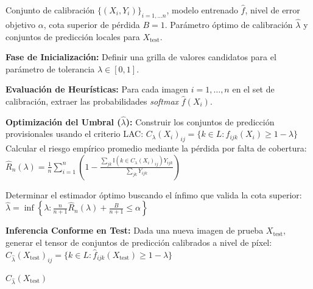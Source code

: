 \begin{algorithm}[H]
\caption{Calibración CRC para Segmentación Semántica Conforme}
\label{alg:crc_segmentation}
\begin{algorithmic}[1]
    \REQUIRE Conjunto de calibración $\{(X_i, Y_i)\}_{i=1, \dots n}$, modelo entrenado $\hat{f}$, nivel de error objetivo $\alpha$, cota superior de pérdida $B=1$.
    \ENSURE Parámetro óptimo de calibración $\hat{\lambda}$ y conjuntos de predicción locales para $X_{\text{test}}$.

    \STATE \textbf{Fase de Inicialización:}
    Definir una grilla de valores candidatos para el parámetro de tolerancia $\lambda \in [0,1]$.

    \STATE \textbf{Evaluación de Heurísticas:}
    Para cada imagen $i = 1, \dots, n$ en el set de calibración, extraer las probabilidades \textit{softmax} $\hat{f}(X_i)$.

    \STATE \textbf{Optimización del Umbral ($\hat{\lambda}$):}
        \STATE Construir los conjuntos de predicción provisionales usando el criterio LAC:
        \STATE $C_\lambda(X_i)_{ij} = \{ k \in L : \hat{f}_{ijk}(X_i) \geq 1 - \lambda \}$
        \STATE Calcular el riesgo empírico promedio mediante la pérdida por falta de cobertura:
        \STATE $\hat{R}_n(\lambda) = \frac{1}{n} \sum_{i=1}^n \left( 1 - \frac{\sum_{jk} \mathbb{I}(k \in C_\lambda(X_i)_{ij}) Y_{ijk}}{\sum_{jk} Y_{ijk}} \right)$
    \ENDFOR

    \STATE Determinar el estimador óptimo buscando el ínfimo que valida la cota superior:
    \STATE $\hat{\lambda} = \inf \left\{ \lambda : \frac{n}{n+1} \hat{R}_n(\lambda) + \frac{B}{n+1} \leq \alpha \right\}$

    \STATE \textbf{Inferencia Conforme en Test:}
    Dada una nueva imagen de prueba $X_{\text{test}}$, generar el tensor de conjuntos de predicción calibrados a nivel de píxel:
    \STATE $C_{\hat{\lambda}}(X_{\text{test}})_{ij} = \{ k \in L : \hat{f}_{ijk}(X_{\text{test}}) \geq 1 - \hat{\lambda} \}$

    \RETURN $C_{\hat{\lambda}}(X_{\text{test}})$
\end{algorithmic}
\end{algorithm}

\vspace{2em}


